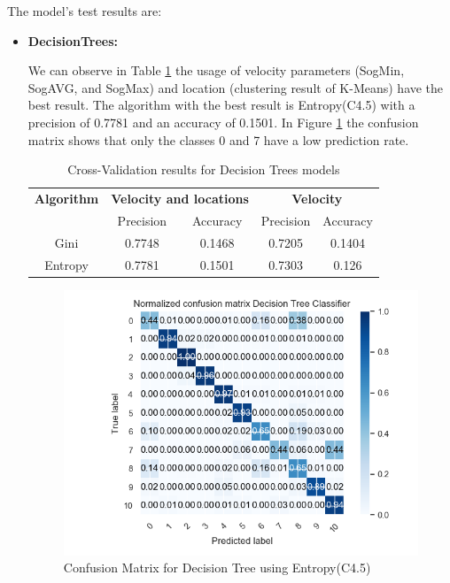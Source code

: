 The model's test results are:
\newpage
\begin{itemize}
\item \textbf{ DecisionTrees: }

We can observe in Table \ref{table:cross_val_decision_trees} the usage of velocity parameters (SogMin, SogAVG, and SogMax) and location (clustering result of K-Means) have the best result. The algorithm with the best result is Entropy(C4.5) with a precision of 0.7781 and an accuracy of 0.1501. In Figure \ref{table:cross_val_decision_trees} the confusion matrix shows that only the classes 0 and 7 have a low prediction rate.


\begin {table}[H]
\begin{center}
\begin{tabular}{c|c|c|c|c}
\multicolumn{1}{c|}{\textbf{Algorithm } }   &\multicolumn{2}{c|}{\textbf{ Velocity and locations}}& \multicolumn{2}{c}{\textbf{ Velocity}}\\
&Precision & Accuracy & Precision & Accuracy \\
\hline
Gini &0.7748&0.1468   &0.7205 &0.1404\\
Entropy   & 0.7781&0.1501   &0.7303 &0.126
\label{table:cross_val_decision_trees}
\end{tabular}
\caption {Cross-Validation results for Decision Trees models}
\end{center}
\end {table}

\begin{figure}[h]
    \centering
    \includegraphics[width=0.8\linewidth]{Chapters/img/CM_DT.png}
    \caption{Confusion Matrix for Decision Tree using Entropy(C4.5)}
    \label{fig:cm_dt}
\end{figure}





\end{itemize}
